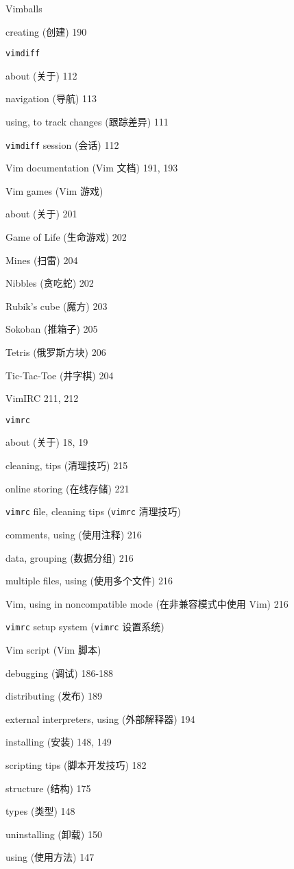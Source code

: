 \begin{multicols}{2}
Vimballs \par
  creating (创建) 190 \par

\texttt{vimdiff} \par
  about (关于) 112 \par
  navigation (导航) 113 \par
  using, to track changes (跟踪差异) 111 \par

\texttt{vimdiff} session (会话) 112

Vim documentation (Vim 文档) 191, 193

Vim games (Vim 游戏) \par
  about (关于) 201 \par
  Game of Life (生命游戏) 202 \par
  Mines (扫雷) 204 \par
  Nibbles (贪吃蛇) 202 \par
  Rubik's cube (魔方) 203 \par
  Sokoban (推箱子) 205 \par
  Tetris (俄罗斯方块) 206 \par
  Tic-Tac-Toe (井字棋) 204 \par

VimIRC 211, 212

\texttt{vimrc} \par
  about (关于) 18, 19 \par
  cleaning, tips (清理技巧) 215 \par
  online storing (在线存储) 221 \par

\texttt{vimrc} file, cleaning tips (\texttt{vimrc} 清理技巧) \par
  comments, using (使用注释) 216 \par
  data, grouping (数据分组) 216 \par
  multiple files, using (使用多个文件) 216 \par
  Vim, using in noncompatible mode (在非兼容模式中使用 Vim) 216 \par

\texttt{vimrc} setup system (\texttt{vimrc} 设置系统) \par

Vim script (Vim 脚本) \par
  debugging (调试) 186-188 \par
  distributing (发布) 189 \par
  external interpreters, using (外部解释器) 194 \par
  installing (安装) 148, 149 \par
  scripting tips (脚本开发技巧) 182 \par
  structure (结构) 175 \par
  types (类型) 148 \par
  uninstalling (卸载) 150 \par
  using (使用方法) 147 \par


\end{multicols}
